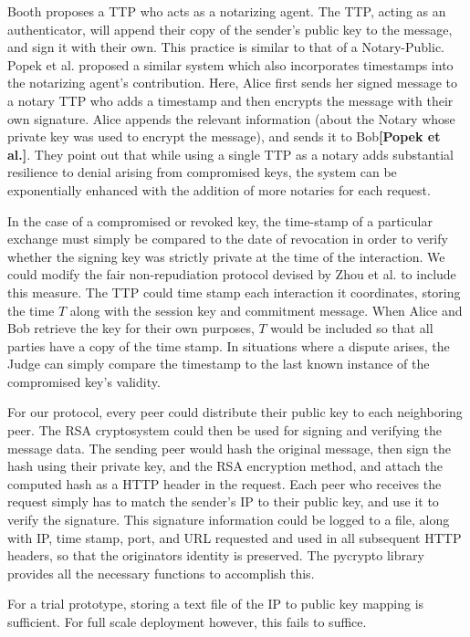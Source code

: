\documentclass[12pt]{article}
\newcommand{\lcite}[1]
{{\bfseries\color{orange}[#1]}}
\begin{document}
			Booth proposes a TTP who acts as a notarizing agent. The TTP, acting as an authenticator, will append their copy of the sender's public key to the message, and sign it with their own. This practice is similar to that of a Notary-Public. Popek et al. proposed a similar system which also incorporates timestamps into the notarizing agent's contribution. Here, Alice first sends her signed message to a notary TTP who adds a timestamp and then encrypts the message with their own signature. Alice appends the relevant information (about the Notary whose private key was used to encrypt the message), and sends it to Bob\lcite{Popek et al.}. They point out that while using a single TTP as a notary adds substantial resilience to denial arising from compromised keys, the system can be exponentially enhanced with the addition of more notaries for each request.

			In the case of a compromised or revoked key, the time-stamp of a particular exchange must simply be compared to the date of revocation in order to verify whether the signing key was strictly private at the time of the interaction. We could modify the fair non-repudiation protocol devised by Zhou et al. to include this measure. The TTP could time stamp each interaction it coordinates, storing the time $T$ along with the session key and commitment message. When Alice and Bob retrieve the key for their own purposes, $T$ would be included so that all parties have a copy of the time stamp. In situations where a dispute arises, the Judge can simply compare the timestamp to the last known instance of the compromised key's validity.

			For our protocol, every peer could distribute their public key to each neighboring peer. The RSA cryptosystem could then be used for signing and verifying the message data. The sending peer would hash the original message, then sign the hash using their private key, and the RSA encryption method, and attach the computed hash as a HTTP header in the request. Each peer who receives the request simply has to match the sender's IP to their public key, and use it to verify the signature. This signature information could be logged to a file, along with IP, time stamp, port, and URL requested and used in all subsequent HTTP headers, so that the originators identity is preserved. The pycrypto library provides all the necessary functions to accomplish this.

			For a trial prototype, storing a text file of the IP to public key mapping is sufficient. For full scale deployment however, this fails to suffice. 
\end{document}
